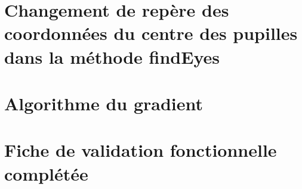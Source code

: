 \documentclass[12pt]{report} %
\begin{document}
\chapter{Changement de repère des coordonnées du centre des pupilles dans la méthode findEyes}
\label{A6}


\chapter{Algorithme du gradient}
\label{A7}


\chapter{Fiche de validation fonctionnelle complétée}
\label{AFV}


\newpage


\nocite{*}


\end{document}
